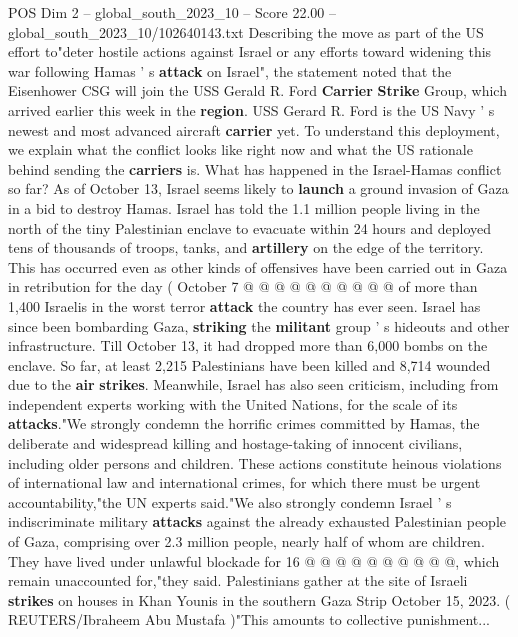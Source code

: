 \begin{textsample}{POS Dim 2 – global\_south\_2023\_10 – Score 22.00 – global\_south\_2023\_10/102640143.txt}  \label{ex:f2_pos_059}
Describing the move as part of the US effort to"deter hostile actions against Israel or any efforts toward widening this war following Hamas ' s \textbf{attack} on Israel", the statement noted that the Eisenhower CSG will join the USS Gerald R.
Ford \textbf{Carrier} \textbf{Strike} Group, which arrived earlier this week in the \textbf{region}.
USS Gerard R.
Ford is the US Navy ' s newest and most advanced aircraft \textbf{carrier} yet.
To understand this deployment, we explain what the conflict looks like right now and what the US rationale behind sending the \textbf{carriers} is.
What has happened in the Israel-Hamas conflict so far?
As of October 13, Israel seems likely to \textbf{launch} a ground invasion of Gaza in a bid to destroy Hamas.
Israel has told the 1.1 million people living in the north of the tiny Palestinian enclave to evacuate within 24 hours and deployed tens of thousands of troops, tanks, and \textbf{artillery} on the edge of the territory.
This has occurred even as other kinds of offensives have been carried out in Gaza in retribution for the day ( October 7 @ @ @ @ @ @ @ @ @ @ of more than 1,400 Israelis in the worst terror \textbf{attack} the country has ever seen.
Israel has since been bombarding Gaza, \textbf{striking} the \textbf{militant} group ' s hideouts and other infrastructure.
Till October 13, it had dropped more than 6,000 bombs on the enclave.
So far, at least 2,215 Palestinians have been killed and 8,714 wounded due to the \textbf{air} \textbf{strikes}.
Meanwhile, Israel has also seen criticism, including from independent experts working with the United Nations, for the scale of its \textbf{attacks}."We strongly condemn the horrific crimes committed by Hamas, the deliberate and widespread killing and hostage-taking of innocent civilians, including older persons and children.
These actions constitute heinous violations of international law and international crimes, for which there must be urgent accountability,"the UN experts said."We also strongly condemn Israel ' s indiscriminate military \textbf{attacks} against the already exhausted Palestinian people of Gaza, comprising over 2.3 million people, nearly half of whom are children.
They have lived under unlawful blockade for 16 @ @ @ @ @ @ @ @ @ @, which remain unaccounted for,"they said.
Palestinians gather at the site of Israeli \textbf{strikes} on houses in Khan Younis in the southern Gaza Strip October 15, 2023. ( REUTERS/Ibraheem Abu Mustafa )"This amounts to collective punishment...

\end{textsample}
